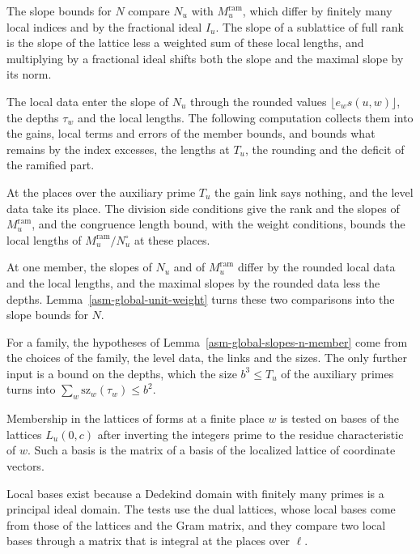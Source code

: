 The slope bounds for $N$ compare $N_u$ with $M^{\mathrm{ram}}_u$, which differ by
finitely many local indices and by the fractional ideal $I_u$. The slope of a
sublattice of full rank is the slope of the lattice less a weighted sum of these
local lengths, and multiplying by a fractional ideal shifts both the slope and
the maximal slope by its norm.

The local data enter the slope of $N_u$ through the rounded values
$\lfloor e_ws(u,w)\rfloor$, the depths $\tau_w$ and the local lengths. The
following computation collects them into the gains, local terms and errors of
the member bounds, and bounds what remains by the index excesses, the lengths at
$T_u$, the rounding and the deficit of the ramified part.

At the places over the auxiliary prime $T_u$ the gain link says nothing, and the
level data take its place. The division side conditions give the rank and the
slopes of $M^{\mathrm{ram}}_u$, and the congruence length bound, with the
weight conditions, bounds the local lengths of $M^{\mathrm{ram}}_u/N^\circ_u$
at these places.

At one member, the slopes of $N_u$ and of $M^{\mathrm{ram}}_u$ differ by the
rounded local data and the local lengths, and the maximal slopes by the rounded
data less the depths. Lemma~\ref{asm-global-unit-weight} turns these two
comparisons into the slope bounds for $N$.

For a family, the hypotheses of Lemma~\ref{asm-global-slopes-n-member} come
from the choices of the family, the level data, the links and the sizes. The
only further input is a bound on the depths, which the size $b^3\le T_u$ of
the auxiliary primes turns into $\sum_w\mathrm{sz}_w(\tau_w)\le b^2$.

Membership in the lattices of forms at a finite place $w$ is tested on bases of
the lattices $L_u(0,c)$ after inverting the integers prime to the residue
characteristic of $w$. Such a basis is the matrix of a basis of the localized
lattice of coordinate vectors.

Local bases exist because a Dedekind domain with finitely many primes is a
principal ideal domain. The tests use the dual lattices, whose local bases come
from those of the lattices and the Gram matrix, and they compare two local
bases through a matrix that is integral at the places over $\ell$.


